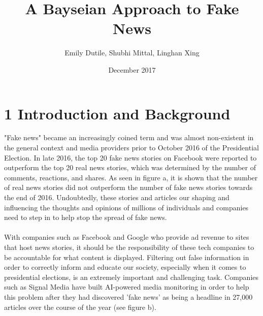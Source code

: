 \documentclass{neu_handout}
\title{A Bayseian Approach to Fake News}
\author{Emily Dutile, Shubhi Mittal, Linghan Xing}
\date{December 2017}
\begin{document}
\section*{1 Introduction and Background}

"Fake news" became an increasingly coined term and was almost non-existent in the general context and media providers prior to October 2016 of the Presidential Election. In late 2016, the top 20 fake news stories on Facebook were reported to outperform the top 20 real news stories, which was determined by the number of comments, reactions, and shares. As seen in figure a, it is shown that the number of real news stories did not outperform the number of fake news stories towards the end of 2016. Undoubtedly, these stories and articles our shaping and influencing the thoughts and opinions of millions of individuals and companies need to step in to help stop the spread of fake news.
\\\\
With companies such as Facebook and Google who provide ad revenue to sites that host news stories, it should be the responsibility of these tech companies to be accountable for what content is displayed. Filtering out false information in order to correctly inform and educate our society, especially when it comes to presidential elections, is an extremely important and challenging task. Companies such as Signal Media have built AI-powered media monitoring in order to help this problem after they had discovered 'fake news' as being a headline in 27,000 articles over the course of the year (see figure b).

\begin{figure}[h]
\centering
{}
\end{figure}
\end{document}
